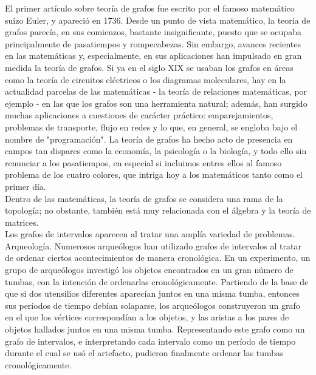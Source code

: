\documentclass[a4paper,12pt]{article}
\begin{document}
El primer artículo sobre teoría de grafos fue escrito por el famoso matemático suizo Euler, y apareció en 1736. Desde un punto de vista matemático, la teoría de grafos parecía, en sus comienzos, bastante insignificante, puesto que se ocupaba principalmente de pasatiempos y rompecabezas. Sin embargo, avances recientes en las matemáticas y, especialmente, en sus aplicaciones han impulsado en gran medida la teoría de grafos. Si ya en el siglo XIX se usaban los grafos en áreas como la teoría de circuitos eléctricos o los diagramas moleculares, hay en la actualidad parcelas de las matemáticas - la teoría de relaciones matemáticas, por ejemplo - en las que los grafos son una herramienta natural; además, han surgido muchas aplicaciones a cuestiones de carácter práctico: emparejamientos, problemas de transporte, flujo en redes y lo que, en general, se engloba bajo el nombre de "programación". La teoría de grafos ha hecho acto de presencia en campos tan dispares como la economía, la psicología o la biología, y todo ello sin renunciar a los pasatiempos, en especial si incluimos entres ellos al famoso problema de los cuatro colores, que intriga hoy a los matemáticos tanto como el primer día.\\

Dentro de las matemáticas, la teoría de grafos se considera una rama de la topología; no obstante, también está muy relacionada con el álgebra y la teoría de matrices.\\

Los grafos de intervalos aparecen al tratar una amplía variedad de problemas. \\

Arqueología. Numerosos arqueólogos han utilizado grafos de intervalos al tratar de ordenar ciertos acontecimientos de manera cronológica. En un experimento, un grupo de arqueólogos investigó los objetos encontrados en un gran número de tumbas, con la intención de ordenarlas cronológicamente. Partiendo de la base de que si dos utensilios diferentes aparecían juntos en una misma tumba, entonces sus períodos de tiempo debían solaparse, los arqueólogos construyeron un grafo en el que los vértices correspondían a los objetos, y las aristas a los pares de objetos hallados juntos en una misma tumba. Representando este grafo como un grafo de intervalos, e interpretando cada intervalo como un período de tiempo durante el cual se usó el artefacto, pudieron finalmente ordenar las tumbas cronológicamente.\\
\end{document}
